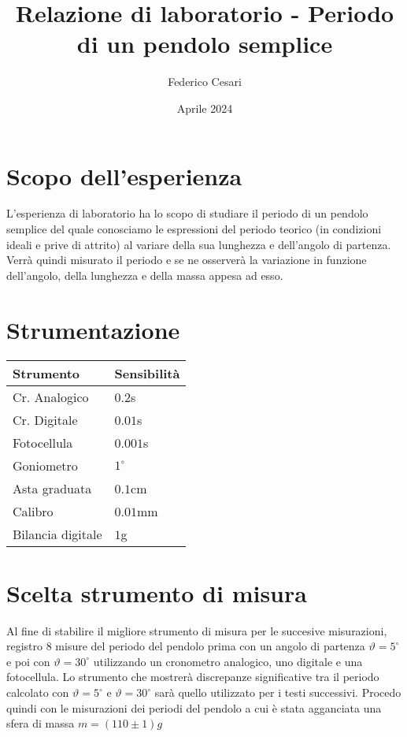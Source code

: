 \documentclass{article}
\title{Relazione di laboratorio - Periodo di un pendolo semplice}
\author{Federico Cesari}
\date{Aprile 2024}
\begin{document}

\tableofcontents

\newpage
\section{Scopo dell’esperienza}
L'esperienza di laboratorio ha lo scopo di studiare il periodo di un pendolo semplice del quale conosciamo le espressioni del periodo teorico (in condizioni ideali e prive di attrito) al variare della sua lunghezza e dell'angolo di partenza. Verrà quindi misurato il periodo e se ne osserverà la variazione in funzione dell'angolo, della lunghezza e della massa appesa ad esso.

\section{Strumentazione}
\begin{table}[H]
	\centering
	\begin{tabular}{@{}ll@{}}
		\textbf{Strumento} & \textbf{Sensibilità} \\ \midrule
		Cr. Analogico      & $0.2$s               \\
		Cr. Digitale       & $0.01$s              \\
		Fotocellula        & $0.001$s             \\
		Goniometro         & $1^\circ$            \\
		Asta graduata      & $0.1$cm              \\
		Calibro            & $0.01$mm             \\
		Bilancia digitale  & $1$g                 \\ \bottomrule
	\end{tabular}
\end{table}









\section{Scelta strumento di misura}

Al fine di stabilire il migliore strumento di misura per le succesive misurazioni, registro 8 misure del periodo del pendolo prima con un angolo di partenza $\vartheta = 5^\circ$ e poi con $\vartheta = 30^\circ$ utilizzando un cronometro analogico, uno digitale e una fotocellula. Lo strumento che mostrerà discrepanze significative tra il periodo calcolato con $\vartheta = 5^\circ$ e $\vartheta = 30^\circ$ sarà quello utilizzato per i testi successivi. Procedo quindi con le misurazioni dei periodi del pendolo a cui è stata agganciata una sfera di massa $m = (110 \pm 1)g$
\end{document}
